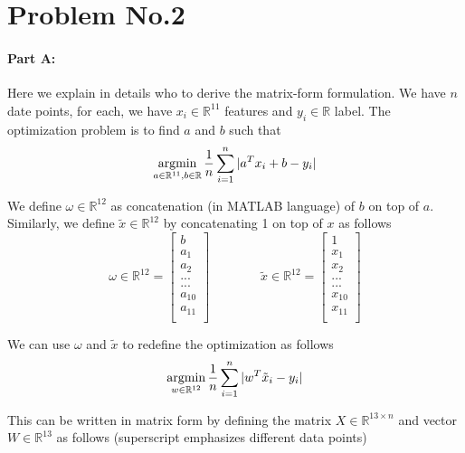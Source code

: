 \section*{Problem No.2} \label{sec:prob2}



\paragraph{Part A:}
Here we explain in details who to derive the matrix-form formulation. We have $n$ date points, for each, we have $x_{i} \in \mathbb{R}^{11}$ features and $y_{i}\in \mathbb{R}$ label. The optimization problem is to find $a$  and $b$ such that 
\[
\operatorname*{argmin}_{a\in \mathbb{R}^{11}, b\in \mathbb{R}} \frac{1}{n} \sum_{i=1}^{n}|a^{T}x_{i}+b - y_{i}|
\]

We define $\omega \in \mathbb{R}^{12}$ as concatenation (in MATLAB language) of $b$ on top of $a$. Similarly, we define  $\tilde{x} \in \mathbb{R}^{12}$  by concatenating 1 on top of $x$ as follows
\[
\omega \in \mathbb{R}^{12} =
\left[
\begin{array}{c}
b \\
a_{1} \\
a_{2} \\
...\\
...\\
a_{10} \\
a_{11} \\
\end{array} 
\right]
\qquad \qquad
\tilde{x} \in \mathbb{R}^{12} =
\left[
\begin{array}{c}
1 \\
x_{1} \\
x_{2} \\
...\\
...\\
x_{10} \\
x_{11} \\
\end{array} 
\right]
\]

We can use $\omega$ and $\tilde{x}$ to redefine the optimization as follows
\[
\operatorname*{argmin}_{w\in \mathbb{R}^{12}} \frac{1}{n} \sum_{i=1}^{n}|w^{T}\tilde{x}_{i} - y_{i}|
\]

This can be written in matrix form by defining the matrix $X\in \mathbb{R}^{13 \times n}$ and vector $W \in \mathbb{R}^{13}$ as follows (superscript emphasizes different data points)


